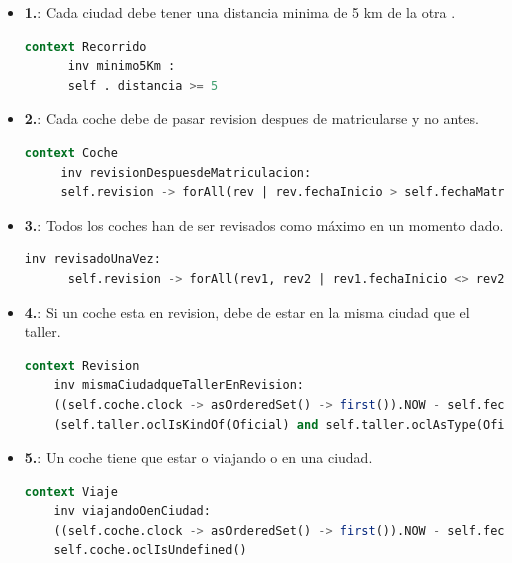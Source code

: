 \documentclass[12pt.a4paper]{article}
\begin{document}
\begin{itemize}
    \item \textbf{1.}: Cada ciudad debe tener una distancia minima de 5 km de la otra .
    \begin{lstlisting}[style = useEspecifico,language=SQL]
    context Recorrido
      inv minimo5Km :
      self . distancia >= 5
    \end{lstlisting}
    
    \item \textbf{2.}: Cada coche debe de pasar revision despues de matricularse y no antes.
    \begin{lstlisting}[style = useEspecifico,language=SQL]
   context Coche
     inv revisionDespuesdeMatriculacion:
     self.revision -> forAll(rev | rev.fechaInicio > self.fechaMatriculacion)
    \end{lstlisting}
    
    \item \textbf{3.}: Todos los coches han de ser revisados como máximo en un momento dado.
    \begin{lstlisting}[style = useEspecifico,language=SQL]
    inv revisadoUnaVez:
      self.revision -> forAll(rev1, rev2 | rev1.fechaInicio <> rev2.fechaInicio and (rev1.fechaInicio >= rev2.fechaFin or rev2.fechaInicio >= rev1.fechaFin))
    \end{lstlisting}
    
    \item \textbf{4.}: Si un coche esta en revision, debe de estar en la misma ciudad que el taller.
    \begin{lstlisting}[style = useEspecifico,language=SQL]
  context Revision
    inv mismaCiudadqueTallerEnRevision:
    ((self.coche.clock -> asOrderedSet() -> first()).NOW - self.fechaFin) < 0 implies
    (self.taller.oclIsKindOf(Oficial) and self.taller.oclAsType(Oficial).ciudad = self.coche.ciudad) or (self.taller.oclIsKindOf(No_Oficial) and self.taller.oclAsType(No_Oficial).ciudad = self.coche.ciudad)
    \end{lstlisting}
    
    \item \textbf{5.}: Un coche tiene que estar o viajando o en una ciudad.
    \begin{lstlisting}[style = useEspecifico,language=SQL]
  context Viaje
    inv viajandoOenCiudad:
    ((self.coche.clock -> asOrderedSet() -> first()).NOW - self.fechaLlegada) < 0 implies
    self.coche.oclIsUndefined()
    \end{lstlisting}
    

\end{itemize}
\end{document}
